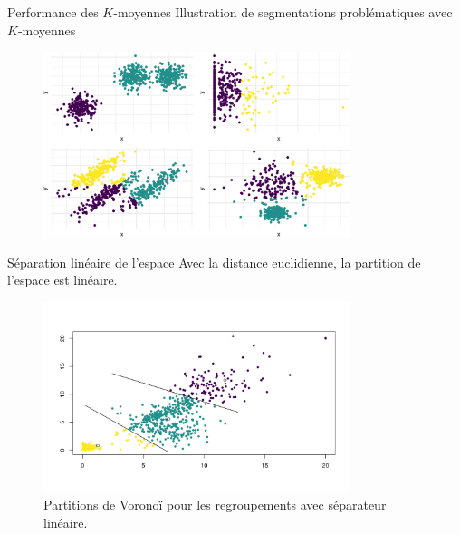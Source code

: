 \documentclass[
  ignorenonframetext,
]{beamer}
\begin{document}
\begin{frame}{Performance des \(K\)-moyennes}
\protect\hypertarget{performance-des-k-moyennes}{}
Illustration de segmentations problématiques avec \(K\)-moyennes

\begin{figure}

{\centering \includegraphics[width=0.8\textwidth,height=\textheight]{MATH60602-diapos11_files/figure-beamer/kmoyperfo-1.pdf}

}

\end{figure}
\end{frame}

\begin{frame}{Séparation linéaire de l'espace}
\protect\hypertarget{suxe9paration-linuxe9aire-de-lespace}{}
Avec la distance euclidienne, la partition de l'espace est linéaire.

\begin{figure}

{\centering \includegraphics[width=0.8\textwidth,height=\textheight]{figures/fig-voronoikmoy.png}

}

\caption{\label{fig-voronoy}Partitions de Voronoï pour les regroupements
avec séparateur linéaire.}

\end{figure}
\end{frame}
\end{document}
